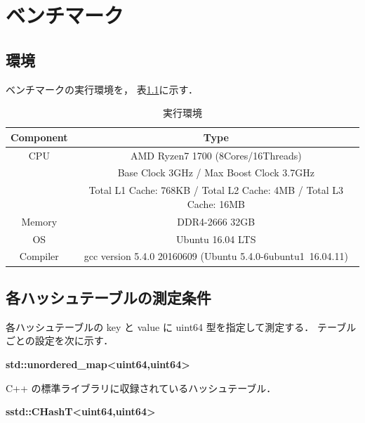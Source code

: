 \chapter{ベンチマーク}
\label{chap_Results}

\section{環境}

ベンチマークの実行環境を，
表\ref{table_env}に示す．

\begin{table}[hbtp]
  \label{table_env}
  \begin{center}
    \caption{実行環境}
    \begin{tabular}{cc} \hline
      Component & Type \rule[0pt]{0pt}{0pt} \\ \hline
      CPU & AMD Ryzen7 1700 (8Cores/16Threads) \rule[0pt]{0pt}{0pt} \\ 
      & Base Clock 3GHz / Max Boost Clock 3.7GHz \rule[0pt]{0pt}{0pt} \\
      & Total L1 Cache: 768KB / Total L2 Cache: 4MB / Total L3 Cache: 16MB \\
      Memory & DDR4-2666 32GB \rule[0pt]{0pt}{0pt} \\
      OS & Ubuntu 16.04 LTS \rule[0pt]{0pt}{0pt} \\
      Compiler & gcc version 5.4.0 20160609 (Ubuntu 5.4.0-6ubuntu1~16.04.11) \rule[0pt]{0pt}{0pt} \\ \hline
    \end{tabular}
  \end{center}
\end{table}


\section{各ハッシュテーブルの測定条件}
各ハッシュテーブルの key と value に uint64 型を指定して測定する．
テーブルごとの設定を次に示す．
\leavevmode \newline

%
{\bf std::unordered\_map<uint64,uint64>}

C++ の標準ライブラリに収録されているハッシュテーブル．
\leavevmode \newline

%
{\bf sstd::CHashT<uint64,uint64>}

